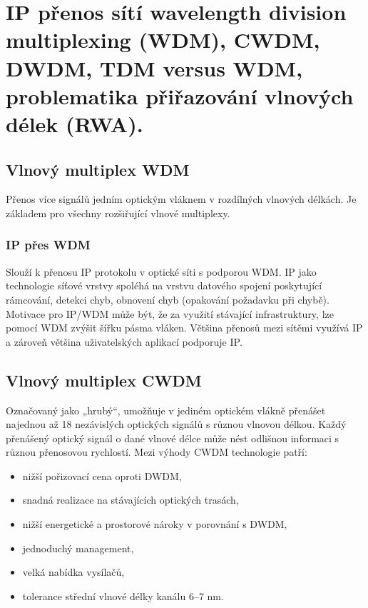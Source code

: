 \clearpage
\section{IP přenos sítí wavelength division multiplexing (WDM), CWDM, DWDM, TDM versus WDM, problematika přiřazování vlnových délek (RWA).}

\subsection{Vlnový multiplex WDM}

Přenos více signálů jedním optickým vláknem v rozdílných vlnových délkách. Je základem pro všechny rozšiřující vlnové multiplexy.

\subsubsection{IP přes WDM}

Slouží k přenosu IP protokolu v optické síti s podporou WDM. IP jako technologie síťové vrstvy spoléhá na vrstvu datového spojení poskytující rámcování, detekci chyb, obnovení chyb (opakování požadavku při chybě). Motivace pro IP/WDM může být, že za využití stávající infrastruktury, lze pomocí WDM zvýšit šířku pásma vláken. Většina přenosů mezi sítěmi využívá IP a zároveň většina uživatelských aplikací podporuje IP.

\subsection{Vlnový multiplex CWDM }
Označovaný jako „hrubý“, umožňuje v jediném optickém vlákně přenášet najednou až 18 nezávislých optických signálů s různou vlnovou délkou. Každý přenášený optický signál o dané vlnové délce může nést odlišnou informaci s různou přenosovou rychlostí.
Mezi výhody CWDM technologie patří:
\begin{itemize}
    \item nižší pořizovací cena oproti DWDM,
    \item snadná realizace na stávajících optických trasách,
    \item nižší energetické a prostorové nároky v porovnání s DWDM,
    \item jednoduchý management,
    \item velká nabídka vysílačů,
    \item tolerance střední vlnové délky kanálu 6–7 nm.
\end{itemize}

